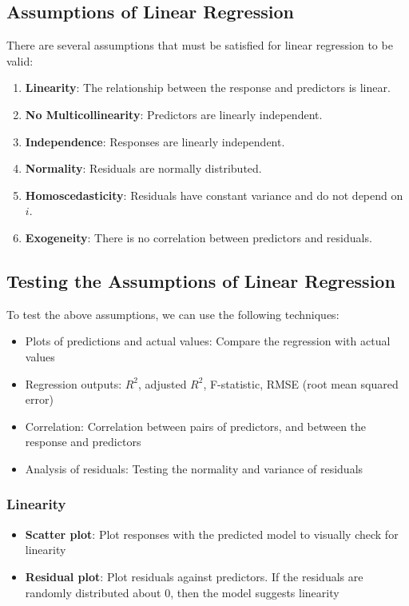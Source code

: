 \documentclass{article}
\begin{document}
\subsection{Assumptions of Linear Regression}
There are several assumptions that must be satisfied for linear
regression to be valid:
\begin{enumerate}
    \item \textbf{Linearity}: The relationship between the response and
          predictors is linear.
    \item \textbf{No Multicollinearity}: Predictors are linearly independent.
    \item \textbf{Independence}: Responses are linearly independent.
    \item \textbf{Normality}: Residuals are normally distributed.
    \item \textbf{Homoscedasticity}: Residuals have constant variance and do not depend on \(i\).
    \item \textbf{Exogeneity}: There is no correlation between predictors and residuals.
\end{enumerate}
\subsection{Testing the Assumptions of Linear Regression}
To test the above assumptions, we can use the following techniques:
\begin{itemize}
    \item Plots of predictions and actual values: Compare the
          regression with actual values
    \item Regression outputs: \(R^2\), adjusted \(R^2\), F-statistic,
          RMSE (root mean squared error)
    \item Correlation: Correlation between pairs of predictors, and
          between the response and predictors
    \item Analysis of residuals: Testing the normality and variance of
          residuals
\end{itemize}
\subsubsection{Linearity}
\begin{itemize}
    \item \textbf{Scatter plot}: Plot responses with the predicted
          model to visually check for linearity
    \item \textbf{Residual plot}: Plot residuals against predictors. If
          the residuals are randomly distributed about 0, then the model
          suggests linearity
\end{itemize}
\end{document}

